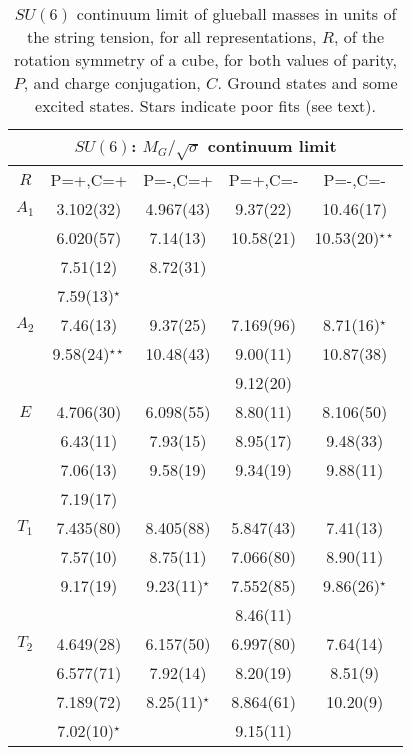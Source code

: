 \documentclass[12pt]{article}
\begin{document}
\begin{table}[htb]
\centering
\begin{tabular}{|c|c|c|c|c|} \hline
\multicolumn{5}{|c|}{$SU(6)$: $M_G/\surd\sigma$  continuum limit} \\ \hline
  $R$   & P=+,C=+ & P=-,C=+ &  P=+,C=-   &  P=-,C=-   \\ \hline
$A_1$  & 3.102(32)  & 4.967(43) & 9.37(22)  & 10.46(17)  \\
    & 6.020(57)  & 7.14(13)  & 10.58(21) & 10.53(20)$^{\star\star}$  \\
    & 7.51(12)   & 8.72(31)  &           &          \\
    & 7.59(13)$^\star$  &     &           &          \\ \hline
$A_2$  & 7.46(13)   & 9.37(25)  & 7.169(96) & 8.71(16)$^\star$  \\
    & 9.58(24)$^{\star\star}$ & 10.48(43) & 9.00(11) & 10.87(38)    \\
    &            &           & 9.12(20)  &           \\ \hline
$E$   & 4.706(30)  & 6.098(55) & 8.80(11)  & 8.106(50)  \\
    & 6.43(11)   & 7.93(15)  & 8.95(17)  & 9.48(33)   \\
    & 7.06(13)   & 9.58(19)  & 9.34(19)  & 9.88(11)   \\
    & 7.19(17)   &           &           &            \\ \hline
$T_1$  & 7.435(80)  & 8.405(88) & 5.847(43) & 7.41(13)   \\
    & 7.57(10)   & 8.75(11)  & 7.066(80) & 8.90(11)    \\
    & 9.17(19)   & 9.23(11)$^\star$  & 7.552(85) & 9.86(26)$^\star$  \\
    &            &           & 8.46(11)  &             \\ \hline
$T_2$  & 4.649(28)  & 6.157(50) & 6.997(80) & 7.64(14)   \\
    & 6.577(71)  & 7.92(14)  & 8.20(19)  & 8.51(9)   \\
    & 7.189(72)  & 8.25(11)$^\star$ & 8.864(61) & 10.20(9)  \\
    & 7.02(10)$^\star$   &           & 9.15(11)  &            \\ \hline
\end{tabular}
\caption{$SU(6)$ continuum limit of glueball masses in units of the string tension,
  for all representations, $R$, of the rotation symmetry of a cube, for
  both values of parity, $P$, and charge conjugation, $C$.
  Ground states and some excited states. Stars
  indicate poor fits (see text).}
\label{table_MK_R_SU6}
\end{table}
\end{document}
